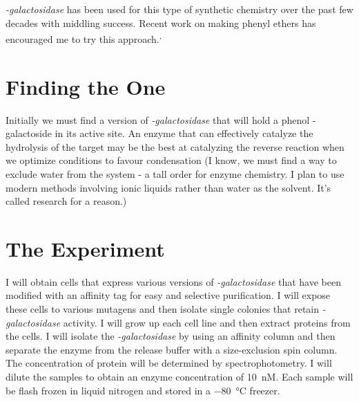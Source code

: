 \documentclass[]{tufte-handout}
\begin{document}
\emph{\textbeta -galactosidase} has been used for this type of synthetic chemistry over the past few decades with middling success. Recent work on making phenyl ethers has encouraged me to try this approach.\textsuperscript{,}

\section{Finding the One}

Initially we must find a version of \emph{\textbeta -galactosidase} that will hold a phenol \textbeta -galactoside in its active site. An enzyme that can effectively catalyze the hydrolysis of the target may be the best at catalyzing the reverse reaction when we optimize conditions to favour condensation (I know, we must find a way to exclude water from the system - a tall order for enzyme chemistry. I plan to use modern methods involving ionic liquids rather than water as the solvent. It's called research for a reason.)

\section{The Experiment}

I will obtain cells that express various versions of \emph{\textbeta -galactosidase} that have been modified with an affinity tag for easy and selective purification. I will expose these cells to various mutagens and then isolate single colonies that retain \emph{\textbeta -galactosidase} activity. I will grow up each cell line and then extract proteins from the cells.  I will isolate the \emph{\textbeta -galactosidase} by using an affinity column and then separate the enzyme from the release buffer with a size-exclusion spin column. The concentration of protein will be determined by spectrophotometry. I will dilute the samples to obtain an enzyme con\-cen\-tra\-tion of \qty{10}{nM}. Each sample will be flash frozen in liquid nitrogen and stored in a \qty{-80}{\degreeCelsius} freezer.
\end{document}
